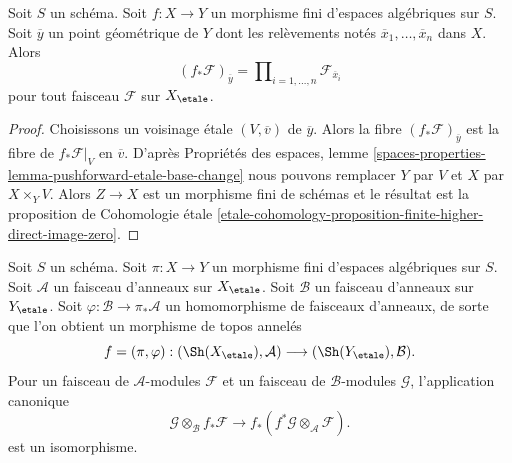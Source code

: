 \begin{lemma}
\label{lemma-stalk-push-finite}
Soit $S$ un schéma. Soit $f : X \to Y$ un morphisme fini d'espaces algébriques
sur $S$. Soit $\overline{y}$ un point géométrique de $Y$ dont les
relèvements notés $\overline{x}_1, \ldots, \overline{x}_n$ dans $X$. Alors
$$
(f_*\mathcal{F})_{\overline{y}} =
\prod\nolimits_{i = 1, \ldots, n}
\mathcal{F}_{\overline{x}_i}
$$
pour tout faisceau $\mathcal{F}$ sur $X_\etale$.
\end{lemma}

\begin{proof}
Choisissons un voisinage étale $(V, \overline{v})$ de $\overline{y}$.
Alors la fibre $(f_*\mathcal{F})_{\overline{y}}$
est la fibre de $f_*\mathcal{F}|_V$ en $\overline{v}$.
D'après Propriétés des espaces,
lemme \ref{spaces-properties-lemma-pushforward-etale-base-change}
nous pouvons remplacer $Y$ par $V$ et $X$ par $X \times_Y V$.
Alors $Z \to X$ est un morphisme fini de schémas et le résultat est
la proposition de Cohomologie étale
\ref{etale-cohomology-proposition-finite-higher-direct-image-zero}.
\end{proof}

\begin{lemma}
\label{lemma-finite-rings}
Soit $S$ un schéma. Soit $\pi : X \to Y$ un morphisme fini d'espaces
algébriques sur $S$. Soit $\mathcal{A}$ un faisceau d'anneaux sur $X_\etale$.
Soit $\mathcal{B}$ un faisceau d'anneaux sur $Y_\etale$.
Soit $\varphi : \mathcal{B} \to \pi_*\mathcal{A}$
un homomorphisme de faisceaux d'anneaux, de sorte que l'on obtient un
morphisme de topos annelés
$$
f = (\pi, \varphi) :
(\Sh(X_\etale), \mathcal{A})
\longrightarrow
(\Sh(Y_\etale), \mathcal{B}).
$$
Pour un faisceau de $\mathcal{A}$-modules $\mathcal{F}$ et un
faisceau de $\mathcal{B}$-modules $\mathcal{G}$, l'application canonique
$$
\mathcal{G} \otimes_\mathcal{B} f_*\mathcal{F}
\longrightarrow
f_*(f^*\mathcal{G} \otimes_\mathcal{A} \mathcal{F}).
$$
est un isomorphisme.
\end{lemma}

